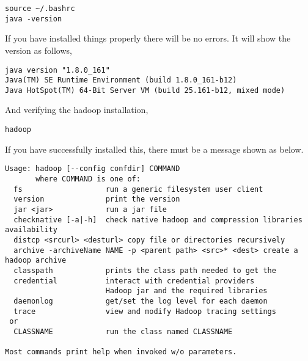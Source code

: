 \begin{lstlisting}
source ~/.bashrc
java -version
\end{lstlisting}

If you have installed things properly there will be no errors. It will
show the version as follows,

\begin{lstlisting}
java version "1.8.0_161"
Java(TM) SE Runtime Environment (build 1.8.0_161-b12)
Java HotSpot(TM) 64-Bit Server VM (build 25.161-b12, mixed mode)
\end{lstlisting}

And verifying the hadoop installation,

\begin{lstlisting}
hadoop
\end{lstlisting}

If you have successfully installed this, there must be a message shown
as below.

\begin{lstlisting}
Usage: hadoop [--config confdir] COMMAND
       where COMMAND is one of:
  fs                   run a generic filesystem user client
  version              print the version
  jar <jar>            run a jar file
  checknative [-a|-h]  check native hadoop and compression libraries availability
  distcp <srcurl> <desturl> copy file or directories recursively
  archive -archiveName NAME -p <parent path> <src>* <dest> create a hadoop archive
  classpath            prints the class path needed to get the
  credential           interact with credential providers
                       Hadoop jar and the required libraries
  daemonlog            get/set the log level for each daemon
  trace                view and modify Hadoop tracing settings
 or
  CLASSNAME            run the class named CLASSNAME

Most commands print help when invoked w/o parameters.
\end{lstlisting}
